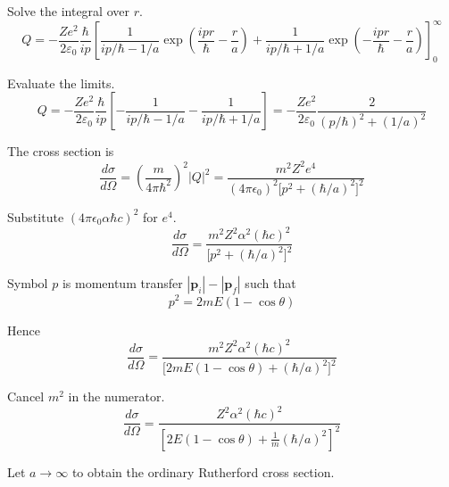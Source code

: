 Solve the integral over $r$.
\begin{equation*}
Q=-\frac{Ze^2}{2\varepsilon_0}
\frac{\hbar}{ip}
\left[
\frac{1}{ip/\hbar-1/a}
\exp\left(\frac{ipr}{\hbar}-\frac{r}{a}\right)
+\frac{1}{ip/\hbar+1/a}
\exp\left(-\frac{ipr}{\hbar}-\frac{r}{a}\right)
\right]_0^\infty
\end{equation*}

Evaluate the limits.
\begin{equation*}
Q=-\frac{Ze^2}{2\varepsilon_0}
\frac{\hbar}{ip}
\left[
-\frac{1}{ip/\hbar-1/a}
-\frac{1}{ip/\hbar+1/a}
\right]
=-\frac{Ze^2}{2\varepsilon_0}\frac{2}{(p/\hbar)^2+(1/a)^2}
\tag{1}
\end{equation*}

The cross section is
\begin{equation*}
\frac{d\sigma}{d\Omega}
=\left(\frac{m}{4\pi\hbar^2}\right)^2|Q|^2
=\frac{m^2Z^2e^4}{(4\pi\epsilon_0)^2\bigl[p^2+(\hbar/a)^2\bigr]^2}
\end{equation*}

Substitute $(4\pi\epsilon_0\alpha\hbar c)^2$ for $e^4$.
\begin{equation*}
\frac{d\sigma}{d\Omega}
=\frac{m^2Z^2\alpha^2(\hbar c)^2}{\bigl[p^2+(\hbar/a)^2\bigr]^2}
\end{equation*}

Symbol $p$ is momentum transfer $|\mathbf p_i|-|\mathbf p_f|$ such that
\begin{equation*}
p^2=2mE(1-\cos\theta)
\end{equation*}

Hence
\begin{equation*}
\frac{d\sigma}{d\Omega}
=\frac{m^2Z^2\alpha^2(\hbar c)^2}{\bigl[2mE(1-\cos\theta)+(\hbar/a)^2\bigr]^2}
\end{equation*}

Cancel $m^2$ in the numerator.
\begin{equation*}
\frac{d\sigma}{d\Omega}
=\frac{Z^2\alpha^2(\hbar c)^2}{\left[2E(1-\cos\theta)+\frac{1}{m}(\hbar/a)^2\right]^2}
\tag{2}
\end{equation*}

Let $a\rightarrow\infty$ to obtain the ordinary Rutherford cross section.



